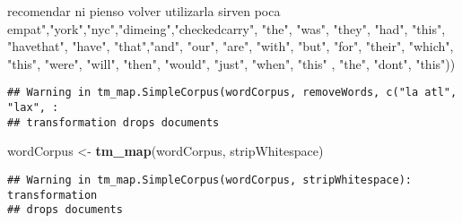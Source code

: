 \documentclass[
]{article}
\newenvironment{Shaded}{\begin{snugshade}}{\end{snugshade}}
\newcommand{\DecValTok}[1]{\textcolor[rgb]{0.00,0.00,0.81}{#1}}
\newcommand{\FunctionTok}[1]{\textcolor[rgb]{0.13,0.29,0.53}{\textbf{#1}}}
\newcommand{\NormalTok}[1]{#1}
\newcommand{\OtherTok}[1]{\textcolor[rgb]{0.56,0.35,0.01}{#1}}
\newcommand{\SpecialCharTok}[1]{\textcolor[rgb]{0.81,0.36,0.00}{\textbf{#1}}}
\newcommand{\StringTok}[1]{\textcolor[rgb]{0.31,0.60,0.02}{#1}}
\begin{document}
\begin{Shaded}
\begin{Highlighting}[]
\StringTok{                                                recomendar ni pienso volver utilizarla sirven poca empat"}\NormalTok{,}\StringTok{"york"}\NormalTok{,}\StringTok{"nyc"}\NormalTok{,}\StringTok{"dimeing"}\NormalTok{,}\StringTok{"checkedcarry"}\NormalTok{, }\StringTok{"the"}\NormalTok{, }\StringTok{"was"}\NormalTok{, }\StringTok{"they"}\NormalTok{, }\StringTok{"had"}\NormalTok{, }\StringTok{"this"}\NormalTok{, }\StringTok{"havethat"}\NormalTok{, }\StringTok{"have"}\NormalTok{, }\StringTok{"that"}\NormalTok{,}\StringTok{"and"}\NormalTok{, }\StringTok{"our"}\NormalTok{, }\StringTok{"are"}\NormalTok{, }\StringTok{"with"}\NormalTok{, }\StringTok{"but"}\NormalTok{, }\StringTok{"for"}\NormalTok{, }\StringTok{"their"}\NormalTok{, }\StringTok{"which"}\NormalTok{, }\StringTok{"this"}\NormalTok{, }\StringTok{"were"}\NormalTok{, }\StringTok{"will"}\NormalTok{, }\StringTok{"then"}\NormalTok{, }\StringTok{"would"}\NormalTok{, }\StringTok{"just"}\NormalTok{, }\StringTok{"when"}\NormalTok{, }\StringTok{"this"}\NormalTok{ , }\StringTok{"the"}\NormalTok{, }\StringTok{"dont"}\NormalTok{, }\StringTok{"this"}\NormalTok{))}
\end{Highlighting}
\end{Shaded}

\begin{verbatim}
## Warning in tm_map.SimpleCorpus(wordCorpus, removeWords, c("la atl", "lax", :
## transformation drops documents
\end{verbatim}

\begin{Shaded}
\begin{Highlighting}[]
\NormalTok{wordCorpus }\OtherTok{\textless{}{-}} \FunctionTok{tm\_map}\NormalTok{(wordCorpus, stripWhitespace)}
\end{Highlighting}
\end{Shaded}

\begin{verbatim}
## Warning in tm_map.SimpleCorpus(wordCorpus, stripWhitespace): transformation
## drops documents
\end{verbatim}

\begin{Shaded}
\end{Shaded}
\end{document}
